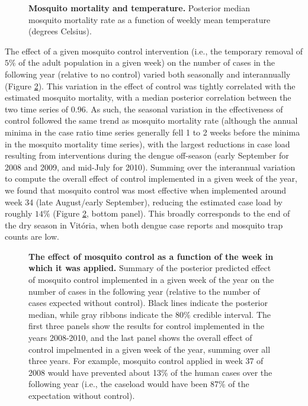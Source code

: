 \documentclass[10pt,letterpaper]{article}
\begin{document}
\begin{figure}[!h]
\caption{{\bf Mosquito mortality and temperature.}
Posterior median mosquito mortality rate as a function of weekly mean temperature (degrees Celsius).
}
\label{mortality}
\end{figure}

The effect of a given mosquito control intervention (i.e., the temporary removal of $5\%$ of the adult population in a given week) on the number of cases in the following year (relative to no control) varied both seasonally and interannually (Figure \ref{control}).
This variation in the effect of control was tightly correlated with the estimated mosquito mortality, with a median posterior correlation between the two time series of 0.96.
As such, the seasonal variation in the effectiveness of control followed the same trend as mosquito mortality rate (although the annual minima in the case ratio time series generally fell 1 to 2 weeks before the minima in the mosquito mortality time series), with the largest reductions in case load resulting from interventions during the dengue off-season (early September for 2008 and 2009, and mid-July for 2010).
Summing over the interannual variation to compute the overall effect of control implemented in a given week of the year, we found that mosquito control was most effective when implemented around  week 34 (late August/early September), reducing the estimated case load by roughly $14\%$ (Figure \ref{control}, bottom panel).
This broadly corresponds to the end of the dry season in Vit\'oria, when both dengue case reports and mosquito trap counts are low.

\begin{figure}[!h]
\caption{{\bf The effect of mosquito control as a function of the week in which it was applied.}
Summary of the posterior predicted effect of mosquito control implemented in a given week of the year on the number of cases in the following year (relative to the number of cases expected without control).
Black lines indicate the posterior median, while gray ribbons indicate the $80\%$ credible interval.
The first three panels show the results for control implemented in the years 2008-2010, and the last panel shows the overall effect of control impelmented in a given week of the year, summing over all three years.
For example, mosquito control applied in week 37 of 2008 would have prevented about 13\% of the human cases over the following year (i.e., the caseload would have been 87\% of the expectation without control).
}
\label{control}
\end{figure}
\end{document}
